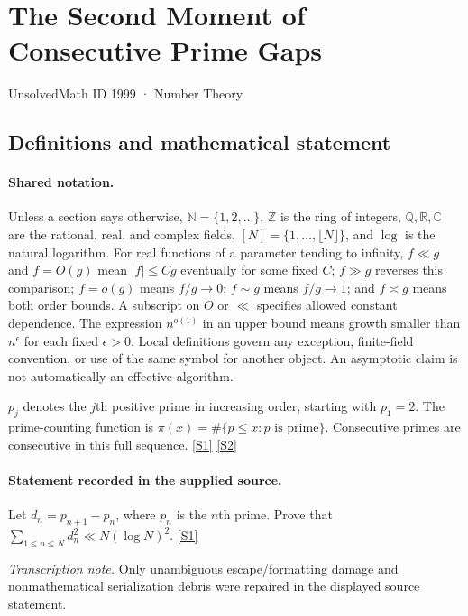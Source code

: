 \documentclass[11pt,a4paper]{article}
\newcommand{\N}{\mathbb{N}}
\newcommand{\Z}{\mathbb{Z}}
\newcommand{\Q}{\mathbb{Q}}
\newcommand{\R}{\mathbb{R}}
\newcommand{\C}{\mathbb{C}}
\newcommand{\sref}[2]{\hyperlink{source:#1:#2}{[S#2]}}
\begin{document}

\setcounter{section}{1998}

\section{The Second Moment of Consecutive Prime Gaps}\label{1999}

{\small\sffamily UnsolvedMath ID 1999 · Number Theory}

\subsection{Definitions and mathematical statement}

\paragraph{Shared notation.}Unless a section says otherwise, $\N=\{1,2,\ldots\}$,
$\Z$ is the ring of integers, $\Q,\R,\C$ are the rational, real, and complex
fields, $[N]=\{1,\ldots,\lfloor N\rfloor\}$, and $\log$ is the natural
logarithm. For real functions of a parameter tending to infinity,
$f\ll g$ and $f=O(g)$ mean $|f|\leq Cg$ eventually for some fixed $C$;
$f\gg g$ reverses this comparison; $f=o(g)$ means $f/g\to0$;
$f\sim g$ means $f/g\to1$; and $f\asymp g$ means both order bounds.
A subscript on $O$ or $\ll$ specifies allowed constant dependence.
The expression $n^{o(1)}$ in an upper bound means growth smaller than
$n^\epsilon$ for each fixed $\epsilon>0$. Local definitions govern any
exception, finite-field convention, or use of the same symbol for another
object. An asymptotic claim is not automatically an effective algorithm.



$p_j$ denotes the $j$th positive prime in increasing order, starting with $p_1=2$. The prime-counting function is $\pi(x)=\#\{p\leq x:p\text{ is prime}\}$. Consecutive primes are consecutive in this full sequence. \sref{1999}{1} \sref{1999}{2}

\paragraph{Statement recorded in the supplied source.}
Let $d_n=p_{n+1}-p_n$, where $p_n$ is the $n$th prime. Prove that $ \sum_{1\leq n\leq N}d_n^2 \ll N(\log N)^2. $ \sref{1999}{1}

{\small\emph{Transcription note.} Only unambiguous escape/formatting damage and nonmathematical serialization debris were repaired in the displayed source statement.}
\end{document}

